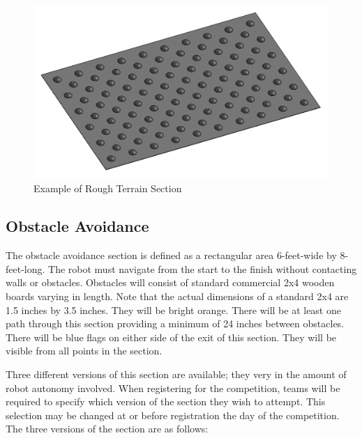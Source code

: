 \begin{figure}[H]
	\centering
	\includegraphics[width=.85\textwidth]{images/rough_terrain.png}
	\caption{Example of Rough Terrain Section}
	\label{fig:rough_terrain} 
\end{figure}

\subsection{Obstacle Avoidance}
The obstacle avoidance section is defined as a rectangular area 6-feet-wide by 8-feet-long. The robot must navigate from the start to the finish without contacting walls or obstacles. Obstacles will consist of standard commercial 2x4 wooden boards varying in length. Note that the actual dimensions of a standard 2x4 are 1.5 inches by 3.5 inches. They will be bright orange. There will be at least one path through this section providing a minimum of 24 inches between obstacles. There will be blue flags on either side of the exit of this section. They will be visible from all points in the section.

Three different versions of this section are available; they very in the amount of robot autonomy involved. When registering for the competition, teams will be required to specify which version of the section they wish to attempt. This selection may be changed at or before registration the day of the competition. The three versions of the section are as follows:

